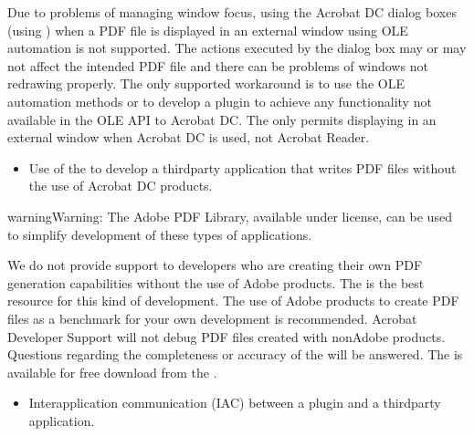 \documentclass[letterpaper,12pt,english,openany,oneside]{sphinxmanual}
\begin{document}
Due to problems of managing window focus, using the Acrobat DC dialog boxes (using  ) when a PDF file is displayed in an external window using OLE automation is not supported. The actions executed by the dialog box may or may not affect the intended PDF file and there can be problems of windows not redrawing properly. The only supported workaround is to use the OLE automation methods or to develop a plug\sphinxhyphen{}in to achieve any functionality not available in the OLE API to Acrobat DC. The  only permits displaying in an external window when Acrobat DC is used, not Acrobat Reader.
\begin{itemize}
\item {} 
Use of the  to develop a third\sphinxhyphen{}party application that writes PDF files without the use of Acrobat DC products.

\end{itemize}

\begin{sphinxadmonition}{warning}{Warning:}
The Adobe PDF Library, available under license, can be used to simplify development of these types of applications.
\end{sphinxadmonition}

We do not provide support to developers who are creating their own PDF generation capabilities without the use of Adobe products. The  is the best resource for this kind of development. The use of Adobe products to create PDF files as a benchmark for your own development is recommended. Acrobat Developer Support will not debug PDF files created with non\sphinxhyphen{}Adobe products. Questions regarding the completeness or accuracy of the  will be answered. The  is available for free download from the  .
\begin{itemize}
\item {} 
Interapplication communication (IAC) between a plug\sphinxhyphen{}in and a third\sphinxhyphen{}party application.

\end{itemize}
\end{document}
